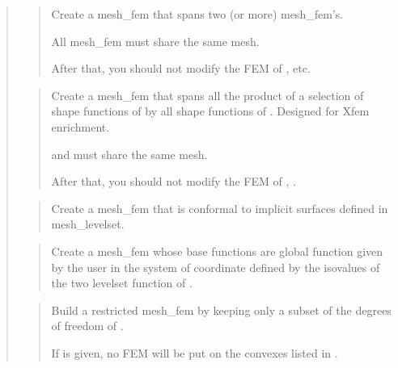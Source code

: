 \documentclass[a4paper,11pt,english]{sphinxmanual}
\begin{document}
\begin{quote}
\begin{quote}
Create a mesh\_fem that spans two (or more) mesh\_fem’s.

All mesh\_fem must share the same mesh.

After that, you should not modify the FEM of ,  etc.
\end{quote}

\begin{quote}

Create a mesh\_fem that spans all the product of a selection of shape
functions of  by all shape functions of .
Designed for Xfem enrichment.

 and  must share the same mesh.

After that, you should not modify the FEM of , .
\end{quote}

\begin{quote}

Create a mesh\_fem that is conformal to implicit surfaces defined in
mesh\_levelset.
\end{quote}

\begin{quote}

Create a mesh\_fem whose base functions are global function given by the
user in the system of coordinate defined by the iso\sphinxhyphen{}values of the two
level\sphinxhyphen{}set function of .
\end{quote}

\begin{quote}

Build a restricted mesh\_fem by keeping only a subset of the degrees of
freedom of .

If  is given, no FEM will be put on the convexes listed in
.
\end{quote}
\end{quote}
\end{document}
